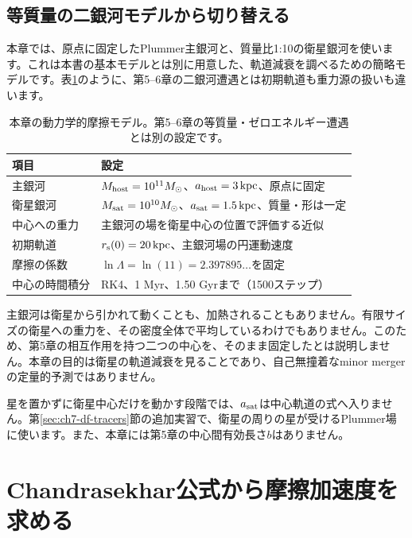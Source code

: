 \subsection{等質量の二銀河モデルから切り替える}
本章では、原点に固定したPlummer主銀河と、質量比1:10の衛星銀河を使います。これは本書の基本モデルとは別に用意した、軌道減衰を調べるための簡略モデルです。表\ref{tab:ch7-df-model}のように、第5--6章の二銀河遭遇とは初期軌道も重力源の扱いも違います。
\begin{table}[htbp]\centering\small
\caption{本章の動力学的摩擦モデル。第5--6章の等質量・ゼロエネルギー遭遇とは別の設定です。}\label{tab:ch7-df-model}
\begin{tabularx}{\linewidth}{lX}\toprule
項目 & 設定 \\\midrule
主銀河 & $M_{\rm host}=10^{11}M_\odot$、$a_{\rm host}=3\,\mathrm{kpc}$、原点に固定 \\
衛星銀河 & $M_{\rm sat}=10^{10}M_\odot$、$a_{\rm sat}=1.5\,\mathrm{kpc}$、質量・形は一定 \\
中心への重力 & 主銀河の場を衛星中心の位置で評価する近似 \\
初期軌道 & $r_{\rm s}(0)=20\,\mathrm{kpc}$、主銀河場の円運動速度 \\
摩擦の係数 & $\ln\Lambda=\ln(11)=2.397895\ldots$を固定 \\
中心の時間積分 & RK4、1 Myr、1.50 Gyrまで（1500ステップ） \\\bottomrule
\end{tabularx}
\end{table}

主銀河は衛星から引かれて動くことも、加熱されることもありません。有限サイズの衛星への重力を、その密度全体で平均しているわけでもありません。このため、第5章の相互作用を持つ二つの中心を、そのまま固定したとは説明しません。本章の目的は衛星の軌道減衰を見ることであり、自己無撞着なminor mergerの定量的予測ではありません。

星を置かずに衛星中心だけを動かす段階では、$a_{\rm sat}$は中心軌道の式へ入りません。第\ref{sec:ch7-df-tracers}節の追加実習で、衛星の周りの星が受けるPlummer場に使います。また、本章には第5章の中心間有効長さ$b$はありません。

\section{Chandrasekhar公式から摩擦加速度を求める}
\label{sec:ch7-df-force}
